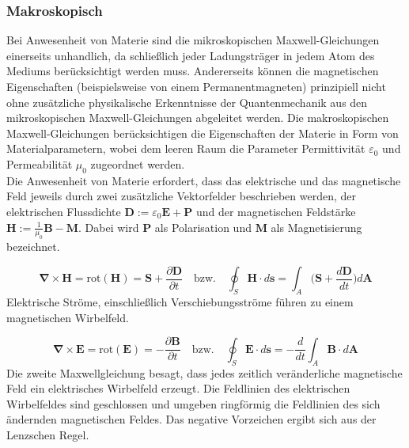 			\subsubsection{Makroskopisch}
				Bei Anwesenheit von Materie sind die mikroskopischen Maxwell-Gleichungen einerseits unhandlich, da schließlich jeder Ladungsträger in jedem Atom des Mediums berücksichtigt werden muss. Andererseits können die magnetischen Eigenschaften (beispielsweise von einem Permanentmagneten) prinzipiell nicht ohne zusätzliche physikalische Erkenntnisse der Quantenmechanik aus den mikroskopischen Maxwell-Gleichungen abgeleitet werden. Die makroskopischen Maxwell-Gleichungen berücksichtigen die Eigenschaften der Materie in Form von Materialparametern, wobei dem leeren Raum die Parameter Permittivität $ \varepsilon_{0} $ und Permeabilität $ \mu_{0} $ zugeordnet werden. \\
				Die Anwesenheit von Materie erfordert, dass das elektrische und das magnetische Feld jeweils durch zwei zusätzliche Vektorfelder beschrieben werden, der elektrischen Flussdichte $ \bm{D} := \varepsilon_{0}\bm{E} + \bm{P} $ und der magnetischen Feldstärke $ \bm{H} := \frac{1}{\mu_{0}}\bm{B} - \bm{M} $. Dabei wird $ \bm{P} $ als Polarisation und $ \bm{M} $ als Magnetisierung bezeichnet.\\
				\begin{tcolorbox}[title=Erste Maxwell'sche Gleichung - Durchflutungsgesetz]
					\begin{equation}
						\bm{\nabla} \times \bm{H} = \text{rot} (\bm{H}) = \bm{S} +  \frac{\partial\bm{D}}{\partial t} \quad	\text{bzw.}	 \quad \oint_{S} \bm{H}\cdot d\bm{s} = \int_{A}\bigg(\bm{S} + \frac{d\bm{D}}{dt}\bigg) d\bm{A}		
					\end{equation}
					\tcblower
					Elektrische Ströme, einschließlich Verschiebungsströme führen zu einem magnetischen Wirbelfeld.		
				\end{tcolorbox}	
				
				\begin{tcolorbox}[title=Zweite Maxwell'sche Gleichung - Induktionsgesetz]
					\begin{equation}
					\bm{\nabla} \times \bm{E}=\text{rot}(\bm{E})=-\frac{\partial \bm{B}}{\partial t} \quad	\text{bzw.}	 \quad \oint_{S} \bm{E}\cdot d\bm{s} = -\frac{d}{dt} \int_{A} \bm{B}\cdot d\bm{A}
					\end{equation}
					\tcblower
					Die zweite Maxwellgleichung besagt, dass jedes zeitlich veränderliche magnetische Feld ein elektrisches Wirbelfeld erzeugt. Die Feldlinien des elektrischen Wirbelfeldes sind geschlossen und umgeben ringförmig die Feldlinien des sich ändernden magnetischen Feldes.  Das negative Vorzeichen ergibt sich aus der Lenzschen Regel.
				\end{tcolorbox}	
						
